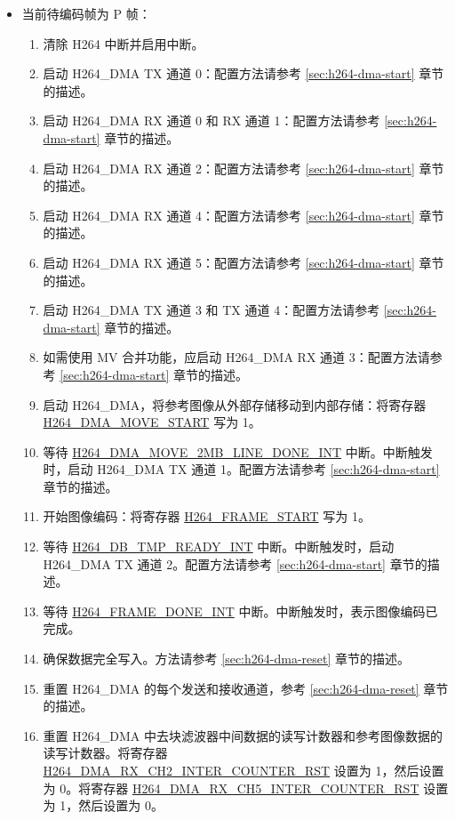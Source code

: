 \documentclass[main\_\_CN.tex]{subfiles}
\begin{document}
\begin{enumerate}
\begin{itemize}
\begin{enumerate}
        \end{enumerate}
        \item 当前待编码帧为 P 帧：
        \begin{enumerate}
            \item 清除 H264 中断并启用中断。
            \item 启动 H264\_DMA TX 通道 0：配置方法请参考 \ref{sec:h264-dma-start} 章节的描述。
            \item 启动 H264\_DMA RX 通道 0 和 RX 通道 1：配置方法请参考 \ref{sec:h264-dma-start} 章节的描述。
            \item 启动 H264\_DMA RX 通道 2：配置方法请参考 \ref{sec:h264-dma-start} 章节的描述。
            \item 启动 H264\_DMA RX 通道 4：配置方法请参考 \ref{sec:h264-dma-start} 章节的描述。
            \item 启动 H264\_DMA RX 通道 5：配置方法请参考 \ref{sec:h264-dma-start} 章节的描述。
            \item 启动 H264\_DMA TX 通道 3 和 TX 通道 4：配置方法请参考 \ref{sec:h264-dma-start} 章节的描述。
            \item 如需使用 MV 合并功能，应启动 H264\_DMA RX 通道 3：配置方法请参考 \ref{sec:h264-dma-start} 章节的描述。
            \item 启动 H264\_DMA，将参考图像从外部存储移动到内部存储：将寄存器 \hyperref[fielddesc:H264DMAMOVESTART]{H264\_DMA\_MOVE\_START} 写为 1。
            \item 等待 \hyperref[int:H264DMAMOVE2MBLINEDONEINT]{H264\_DMA\_MOVE\_2MB\_LINE\_DONE\_INT} 中断。中断触发时，启动 H264\_DMA TX 通道 1。配置方法请参考 \ref{sec:h264-dma-start} 章节的描述。
            \item 开始图像编码：将寄存器 \hyperref[fielddesc:H264FRAMESTART]{H264\_FRAME\_START} 写为 1。
            \item 等待 \hyperref[int:H264DBTMPREADYINT]{H264\_DB\_TMP\_READY\_INT} 中断。中断触发时，启动 H264\_DMA TX 通道 2。配置方法请参考 \ref{sec:h264-dma-start} 章节的描述。
            \item 等待 \hyperref[int:H264FRAMEDONEINT]{H264\_FRAME\_DONE\_INT} 中断。中断触发时，表示图像编码已完成。
            \item 确保数据完全写入。方法请参考 \ref{sec:h264-dma-reset} 章节的描述。
            \item 重置 H264\_DMA 的每个发送和接收通道，参考 \ref{sec:h264-dma-reset} 章节的描述。
            \item 重置 H264\_DMA 中去块滤波器中间数据的读写计数器和参考图像数据的读写计数器。将寄存器 \hyperref[fielddesc:H264DMARXCH2INTERCOUNTERRST]{H264\_DMA\_RX\_CH2\_INTER\_COUNTER\_RST} 设置为 1，然后设置为 0。将寄存器 \hyperref[fielddesc:H264DMARXCH5INTERCOUNTERRST]{H264\_DMA\_RX\_CH5\_INTER\_COUNTER\_RST} 设置为 1，然后设置为 0。

\end{enumerate}
\end{itemize}
\end{enumerate}
\end{document}
